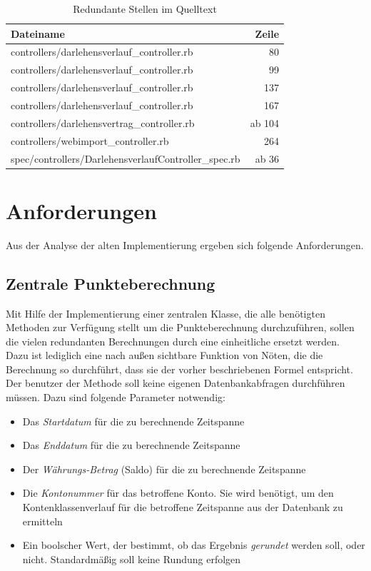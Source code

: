 \documentclass[12pt]{scrreprt}
\begin{document}
\begin{table}
  \begin{center}
    \begin{tabular}{|l|r|}
      \hline
      \textbf{Dateiname} & \textbf{Zeile}\\
      \hline
      controllers/darlehensverlauf\_controller.rb & 80\\
      \hline
      controllers/darlehensverlauf\_controller.rb & 99\\
      \hline
      controllers/darlehensverlauf\_controller.rb & 137\\
      \hline
      controllers/darlehensverlauf\_controller.rb & 167\\
      \hline
      controllers/darlehensvertrag\_controller.rb & ab 104\\
      \hline
      controllers/webimport\_controller.rb & 264\\
      \hline
      spec/controllers/DarlehensverlaufController\_spec.rb & ab 36\\
      \hline
    \end{tabular}
    \caption{Redundante Stellen im Quelltext}
    \label{redundant}
  \end{center}
\end{table}
\vspace{2mm}

\section{Anforderungen}
Aus der Analyse der alten Implementierung ergeben sich folgende Anforderungen.

\subsection{Zentrale Punkteberechnung}
Mit Hilfe der Implementierung einer zentralen Klasse, die alle benötigten Methoden zur Verfügung stellt um die Punkteberechnung durchzuführen, sollen die vielen redundanten Berechnungen durch eine einheitliche ersetzt werden. Dazu ist lediglich eine nach außen sichtbare Funktion von Nöten, die die Berechnung so durchführt, dass sie der vorher beschriebenen Formel entspricht. Der benutzer der Methode soll keine eigenen Datenbankabfragen durchführen müssen. Dazu sind folgende Parameter notwendig:

\begin{itemize}
  \item Das \emph{Startdatum} für die zu berechnende Zeitspanne
  \item Das \emph{Enddatum} für die zu berechnende Zeitspanne
  \item Der \emph{Währungs-Betrag} (Saldo) für die zu berechnende Zeitspanne
  \item Die \emph{Kontonummer} für das betroffene Konto. Sie wird benötigt, um den Kontenklassenverlauf für die betroffene Zeitspanne aus der Datenbank zu ermitteln
  \item Ein boolscher Wert, der bestimmt, ob das Ergebnis \emph{gerundet} werden soll, oder nicht. Standardmäßig soll keine Rundung erfolgen
\end{itemize}
\end{document}
